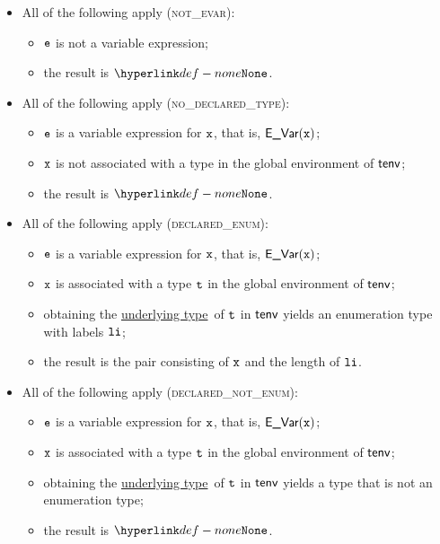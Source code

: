 \documentclass{book}
\newcommand\ProseOrTypeError[0]{\ProseTerminateAs{\TypeErrorConfig}}
\newcommand\underlyingtype[0]{\hyperlink{def-underlyingtype}{underlying type}}
\begin{document}
\begin{itemize}
  \item All of the following apply (\textsc{not\_evar}):
  \begin{itemize}
    \item $\texttt{e}$ is not a variable expression;
    \item the result is $\None$.
  \end{itemize}

  \item All of the following apply (\textsc{no\_declared\_type}):
  \begin{itemize}
    \item $\texttt{e}$ is a variable expression for $\texttt{x}$, that is, $\textsf{E\_Var}(\texttt{x})$;
    \item $\texttt{x}$ is not associated with a type in the global environment of $\textsf{tenv}$;
    \item the result is $\None$.
  \end{itemize}

  \item All of the following apply (\textsc{declared\_enum}):
  \begin{itemize}
    \item $\texttt{e}$ is a variable expression for $\texttt{x}$, that is, $\textsf{E\_Var}(\texttt{x})$;
    \item $\texttt{x}$ is associated with a type $\texttt{t}$ in the global environment of $\textsf{tenv}$;
    \item obtaining the \underlyingtype\ of $\texttt{t}$ in $\textsf{tenv}$ yields an enumeration type with labels $\texttt{li}$\ProseOrTypeError;
    \item the result is the pair consisting of $\texttt{x}$ and the length of $\texttt{li}$.
  \end{itemize}

  \item All of the following apply (\textsc{declared\_not\_enum}):
  \begin{itemize}
    \item $\texttt{e}$ is a variable expression for $\texttt{x}$, that is, $\textsf{E\_Var}(\texttt{x})$;
    \item $\texttt{x}$ is associated with a type $\texttt{t}$ in the global environment of $\textsf{tenv}$;
    \item obtaining the \underlyingtype\ of $\texttt{t}$ in $\textsf{tenv}$ yields a type that is not an enumeration type;
    \item the result is $\None$.
  \end{itemize}
\end{itemize}
\end{document}

